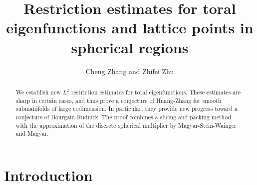\documentclass[11pt,reqno]{amsart}
\numberwithin{equation}{section}
\newcommand{\1}{\textbf{1}}
\begin{document}
	\title[Restriction of toral eigenfunctions]
	{Restriction estimates for toral eigenfunctions and lattice points in  spherical regions}
	
	
	
	
	
	
	
	
	\author{ Cheng Zhang and Zhifei Zhu}
	
	\address{Mathematical Sciences Center\\
		Tsinghua University\\
		Beijing, BJ 100084, China}
	
	
	
	
	
	
	
	
	
	\dedicatory{}
	
	
	
	
	\begin{abstract}
		We establish new $L^2$ restriction estimates for toral eigenfunctions. These estimates are sharp in certain cases, and thus prove a conjecture of Huang-Zhang for smooth submanifolds of large codimension. In particular, they provide new progress toward a conjecture of Bourgain-Rudnick. The proof combines a slicing and packing method with the approximation of the discrete spherical multiplier by Magyar-Stein-Wainger and Magyar.
	\end{abstract}
	
	\maketitle
	
	\section{Introduction}
	
\end{document}
